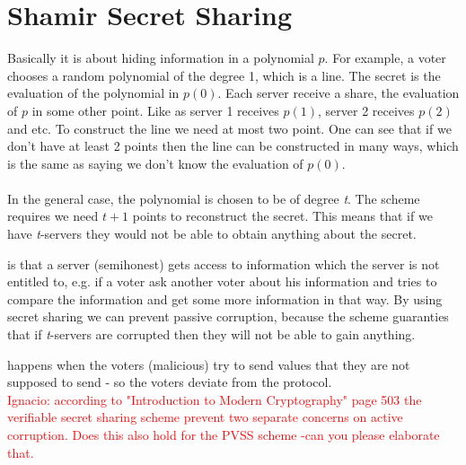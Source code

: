 \section{Shamir Secret Sharing}
Basically it is about hiding information in a polynomial \begin{math}p\end{math}. For example, a voter chooses a random polynomial of the degree 1, which is a line. The secret is the evaluation of the polynomial in \begin{math}p(0)\end{math}. Each server receive a share, the evaluation of  \begin{math}p\end{math} in some other point. Like as server  1 receives  \begin{math}p(1)\end{math}, server 2 receives \begin{math}p(2)\end{math} and etc. To construct the line we need at most two point. One can see that if we don’t have at least 2 points then the line can be constructed in many ways, which is the same as saying we don’t know the evaluation of \begin{math}p(0)\end{math}.\\ \\
In the general case, the polynomial is chosen to be of degree \textit{t}. The scheme requires we need 
 \begin{math}t+1\end{math} points to reconstruct the secret. This means that if we have \textit{t}-servers they would not be able to obtain anything about the secret. 

 is that a server (semihonest) gets access to information which the server is not entitled to, e.g. if a voter ask another voter about his information and tries to compare the information and get some more information in that way. By using secret sharing we can prevent passive corruption, because the scheme guaranties that if \textit{t}-servers are corrupted then they will not be able to gain anything.

 happens when the voters (malicious) try to send values that they are not supposed to send - so the voters deviate from the protocol. \\
\textcolor{red}{Ignacio: according to "Introduction to Modern Cryptography" page 503 the verifiable secret sharing scheme prevent two separate concerns on active corruption. Does this also hold for the PVSS scheme -can you please elaborate that. }

